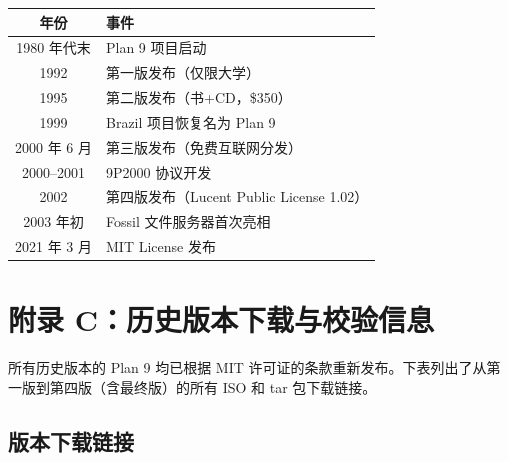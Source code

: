 \documentclass[12pt,UTF8]{ctexbook}
\begin{document}
\begin{center}
	\begin{longtable}{|c|p{8cm}|}
		\hline
		\textbf{年份} & \textbf{事件} \\
		\hline
		1980 年代末 & Plan 9 项目启动 \\
		1992 & 第一版发布（仅限大学） \\
		1995 & 第二版发布（书+CD，\$350） \\
		1999 & Brazil 项目恢复名为 Plan 9 \\
		2000 年 6 月 & 第三版发布（免费互联网分发） \\
		2000--2001 & 9P2000 协议开发 \\
		2002 & 第四版发布（Lucent Public License 1.02） \\
		2003 年初 & Fossil 文件服务器首次亮相 \\
		2021 年 3 月 & MIT License 发布 \\
		\hline
	\end{longtable}
\end{center}

\chapter*{附录 C：历史版本下载与校验信息}

所有历史版本的 Plan 9 均已根据 MIT 许可证的条款重新发布。下表列出了从第一版到第四版（含最终版）的所有 ISO 和 tar 包下载链接。

\section*{版本下载链接}
\end{document}
